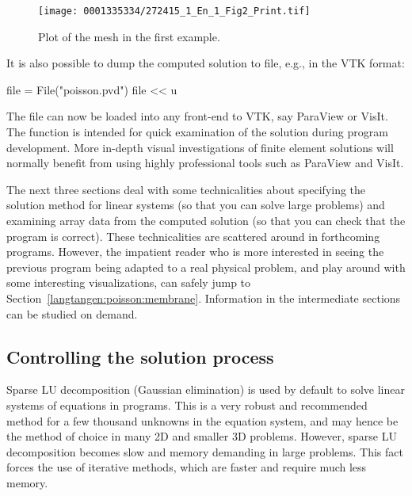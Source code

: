 \begin{figure}[!b]
  \centering
  \texttt{[image: 0001335334/272415\_1\_En\_1\_Fig2\_Print.tif]}
  \caption{Plot of the mesh in the first \fenics{} example.}
  \label{langtangen:poisson:2D:fig:ex1:mesh}
\end{figure}

It is also possible to dump the computed solution to file, e.g., in the
VTK format:
\begin{python}
file = File("poisson.pvd")
file << u
\end{python}
The  file can now be loaded into any front-end to VTK,
say ParaView or VisIt. The  function is intended
for quick examination of the solution during program development.
More in-depth visual investigations of finite element solutions will
normally benefit from using highly professional tools such as ParaView
and VisIt.



The next three sections deal with some technicalities about specifying
the solution method for linear systems (so that you can solve large
problems) and examining array data from the computed solution (so that
you can check that the program is correct).  These technicalities are
scattered around in forthcoming programs. However, the impatient reader who
is more interested in seeing the previous program being adapted to a
real physical problem, and play around with some interesting
visualizations, can safely jump to Section~\ref{langtangen:poisson:membrane}.
Information in the intermediate sections can be studied on demand.

\subsection{Controlling the solution process}
\label{langtangen:poisson1:solve:prm}

Sparse LU decomposition (Gaussian elimination)
is used by default to solve linear systems of equations in \fenics{} programs.
This is a very robust and recommended method for a few thousand
unknowns in the equation system, and may hence be the method of
choice in many 2D and smaller 3D problems. However, sparse LU
decomposition becomes slow and memory demanding in large problems.
This fact forces the use of iterative methods, which are faster
and require much less memory.

